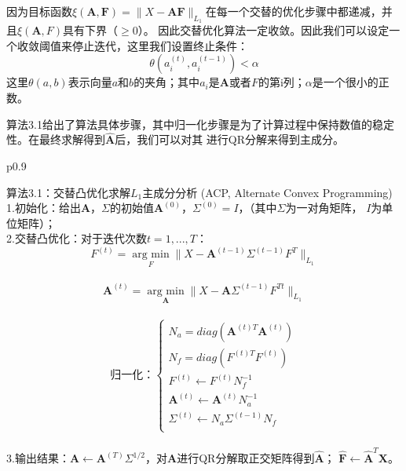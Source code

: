 因为目标函数$\xi (\bm{A},\bm F) = \|X - \bm{A}\bm{F}\|_{L_1}$在每一个交替的优化步骤中都递减，并且$\xi( \bm{A},F)$具有下界（$\geq 0$）。
因此交替优化算法一定收敛。因此我们可以设定一个收敛阈值来停止迭代，这里我们设置终止条件：
    $$ \theta(a_i^{(t)}, a_i^{(t-1)}) <  \alpha $$
这里$\theta(a, b)$表示向量$a$和$b$的夹角；其中$a_i$是$\bm{A}$或者$F$的第i列；$\alpha$是一个很小的正数。

算法3.1给出了算法具体步骤，其中归一化步骤是为了计算过程中保持数值的稳定性。在最终求解得到$\hat {\bm{A}}$后，我们可以对其
进行QR分解来得到主成分。

\begin{table}[H]%
    \centering%
    \begin{tabular}{{p{0.9\columnwidth}}}%
    
    \toprule%
    算法3.1：交替凸优化求解$L_1$主成分分析 (ACP, Alternate Convex Programming) \\
    \midrule%
    1.初始化：给出$\bm{A}$，$\Sigma$的初始值$\bm{A}^{(0)}$，$\Sigma^{(0)} = I$，（其中$\Sigma$为一对角矩阵，
    $I$为单位矩阵）； \\

    2.交替凸优化：对于迭代次数$t = 1, ..., T$： \\
    $$ F^{(t)} = \underset{F}{\operatorname{arg\ min}} \|X - \bm{A}^{(t-1)}\Sigma^{(t-1)}F^{T}\|_{L_1}$$ \\
    $$ \bm{A}^{(t)} = \underset{\bm{A}}{\operatorname{arg\ min}} \|X - \bm{A}\Sigma^{(t-1)}F^{Tt} \|_{L_1}$$ \\
    \begin{equation*}
        \text{归一化：}\left\{
                    \begin{array}{clr}
                    N_a = diag(\bm{A}^{(t)T}\bm{A}^{(t)})\\
                    N_f = diag(F^{(t)T}F^{(t)})\\
                    F^{(t)} \leftarrow F^{(t)}N_f^{-1}\\
                    \bm{A}^{(t)}\leftarrow \bm{A}^{(t)}N_a^{-1}\\
                    \Sigma^{(t)} \leftarrow N_a\Sigma^{(t-1)}N_f\\
                    \end{array}
        \right.
    \end{equation*} \\

    3.输出结果：$\bm{A} \leftarrow \bm{A}^{(T)}\Sigma^{1/2}$，对$\bm{A}$进行QR分解取正交矩阵得到$\hat{\bm{A}}$；
    $\hat{\bm{F}} \leftarrow \hat{\bm{A}}^T\bm{X}$。 \\
    \bottomrule%
    \end{tabular}
\end{table}%


